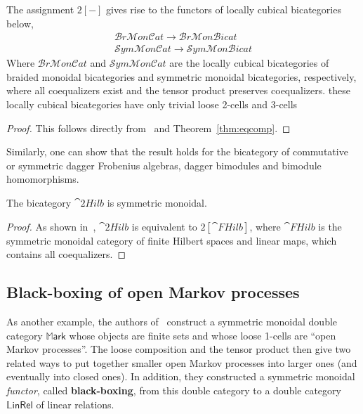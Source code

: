 \begin{thm}
The assignment $2[-]$ gives rise to the functors of locally cubical bicategories below,
\begin{align*}
 \mathcal{B}r\mathcal{M}on\mathcal{C}at \rightarrow \mathcal{B}r\mathcal{M}on\mathcal{B}icat\\
 \mathcal{S}ym\mathcal{M}on\mathcal{C}at \rightarrow \mathcal{S}ym\mathcal{M}on\mathcal{B}icat
\end{align*}
Where $\mathcal{B}r\mathcal{M}on\mathcal{C}at$ and $\mathcal{S}ym\mathcal{M}on\mathcal{C}at$ are the locally cubical bicategories of braided monoidal bicategories and symmetric monoidal bicategories, respectively, where all coequalizers exist and the tensor product preserves coequalizers. these locally cubical bicategories have only trivial loose 2-cells and 3-cells
\end{thm}

\begin{proof}
This follows directly from~\cite[Proposition5.4.25]{westerPhDthesis} and Theorem~\ref{thm:eqcomp}.
\end{proof}

Similarly, one can show that the result holds for the bicategory of commutative or symmetric dagger Frobenius algebras, dagger bimodules and bimodule homomorphisms.


\begin{cor}
The bicategory $\cat{2Hilb}$ is symmetric monoidal.
\end{cor}

\begin{proof}
As shown in~\cite[Section 3.6.3]{westerthesis}, $\cat{2Hilb}$ is equivalent to $2[\cat{FHilb}]$, where $\cat{FHilb}$ is the symmetric monoidal category of finite Hilbert spaces and linear maps, which contains all coequalizers.
\end{proof}

\subsection*{Black-boxing of open Markov processes}
\label{sec:markov}

As another example, the authors of~\cite{bc:markov} construct a symmetric monoidal double category $\mathbb{M}\mathsf{ark}$ whose objects are finite sets and whose loose 1-cells are ``open Markov processes''.
The loose composition and the tensor product then give two related ways to put together smaller open Markov processes into larger ones (and eventually into closed ones).
In addition, they constructed a symmetric monoidal \emph{functor}, called \textbf{black-boxing}, from this double category to a double category $\mathbb{L}\mathsf{inRel}$ of linear relations.

